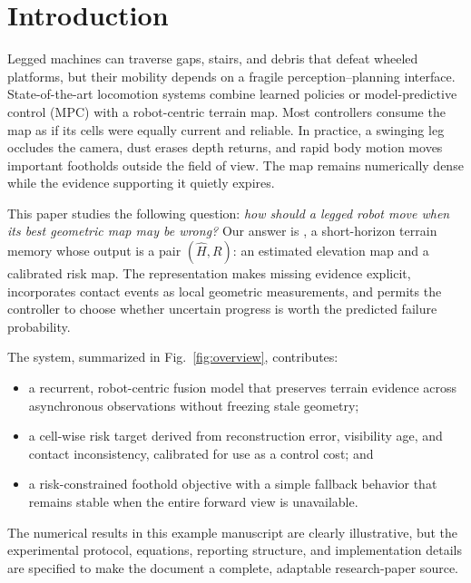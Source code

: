 \section{Introduction}

Legged machines can traverse gaps, stairs, and debris that defeat wheeled platforms, but
their mobility depends on a fragile perception--planning interface. State-of-the-art
locomotion systems combine learned policies \cite{hwangbo2019skills,miki2022wild} or
model-predictive control (MPC) \cite{grandia2023perceptive} with a robot-centric terrain
map. Most controllers consume the map as if its cells were equally current and reliable.
In practice, a swinging leg occludes the camera, dust erases depth returns, and rapid body
motion moves important footholds outside the field of view. The map remains numerically
dense while the evidence supporting it quietly expires.

This paper studies the following question: \emph{how should a legged robot move when its
best geometric map may be wrong?} Our answer is \method{}, a short-horizon terrain memory
whose output is a pair $(\hat{H},R)$: an estimated elevation map and a calibrated risk map.
The representation makes missing evidence explicit, incorporates contact events as local
geometric measurements, and permits the controller to choose whether uncertain progress is
worth the predicted failure probability.

The system, summarized in Fig.~\ref{fig:overview}, contributes:
\begin{itemize}
  \item a recurrent, robot-centric fusion model that preserves terrain evidence across
        asynchronous observations without freezing stale geometry;
  \item a cell-wise risk target derived from reconstruction error, visibility age, and
        contact inconsistency, calibrated for use as a control cost; and
  \item a risk-constrained foothold objective with a simple fallback behavior that remains
        stable when the entire forward view is unavailable.
\end{itemize}
The numerical results in this example manuscript are clearly illustrative, but the
experimental protocol, equations, reporting structure, and implementation details are
specified to make the document a complete, adaptable research-paper source.


